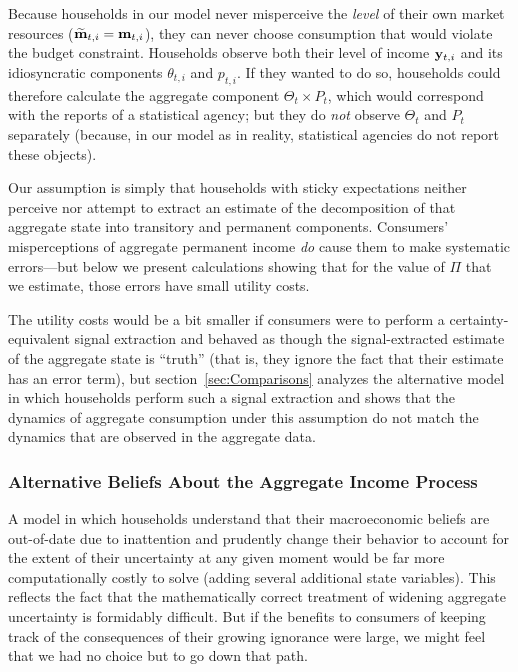Because households in our model never misperceive the \textit{level} of their own market resources ($\widetilde{\mathbf{m}}_{t,i}=\mathbf{m}_{t,i}$), they can never choose consumption that would violate the budget constraint.  Households observe both their level of income $\mathbf{y}_{t,i}$ and its idiosyncratic components $\theta_{t,i}$ and ${p}_{t,i}$. If they wanted to do so, households could therefore calculate the aggregate component $\Theta_{t}\times {P}_{t}$, which would correspond with the reports of a statistical agency; but they do \textit{not} observe $\Theta_{t}$ and ${P}_{t}$ separately (because, in our model as in reality, statistical agencies do not report these objects).

Our assumption is simply that households with sticky expectations neither perceive nor attempt to extract an estimate of the decomposition of that aggregate state into transitory and permanent components.  Consumers' misperceptions of aggregate permanent income \textit{do} cause them to make systematic errors---but below we present calculations showing that for the value of $\Pi$ that we estimate, those errors have small utility costs.

The utility costs would be a bit smaller if consumers were to perform a certainty-equivalent signal extraction and behaved as though the signal-extracted estimate of the aggregate state is ``truth'' (that is, they ignore the fact that their estimate has an error term), but section~\ref{sec:Comparisons} analyzes the alternative model in which households perform such a signal extraction and shows that the dynamics of aggregate consumption under this assumption do not match the dynamics that are observed in the aggregate data.

\hypertarget{AltBeliefs}{}
\subsubsection{Alternative Beliefs About the Aggregate Income Process}
A model in which households understand that their macroeconomic beliefs are out-of-date due to inattention and prudently change their behavior to account for the extent of their uncertainty at any given moment would be far more computationally costly to solve (adding several additional state variables).  This reflects the fact that the mathematically correct treatment of widening aggregate uncertainty is formidably difficult.  But if the benefits to consumers of keeping track of the consequences of their growing ignorance were large, we might feel that we had no choice but to go down that path.

